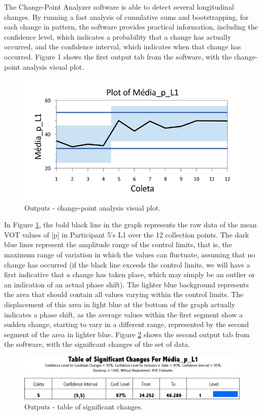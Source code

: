 The Change-Point Analyzer software is able to detect several longitudinal
changes. By running a fast analysis of cumulative sums and bootstrapping, for
each change in pattern, the software provides practical information, including
the confidence level, which indicates a probability that a change has actually
occurred, and the confidence interval, which indicates when that change has
occurred. Figure 1 shows the first output tab from the software, with the
change-point analysis visual plot.

\begin{figure}[h]
\centering
\includegraphics[width=0.7\linewidth]{imgs/lauracastilho22-image1.png}
\caption{Outputs - change-point analysis visual plot.} 
\label{laura-fig01}
\end{figure}

In Figure \ref{laura-fig01}, the bold black line in the graph represents the raw data of the
mean VOT values of [p] in Participant 5’s L1 over the 12 collection points. The
dark blue lines represent the amplitude range of the control limits, that is,
the maximum range of variation in which the values can fluctuate, assuming that
no change has occurred (if the black line exceeds the control limits, we will
have a first indicative that a change has taken place, which may simply be an
outlier or an indication of an actual phase shift). The lighter blue background
represents the area that should contain all values varying within the control
limits. The displacement of this area in light blue at the bottom of the graph
actually indicates a phase shift, as the average values within the first
segment show a sudden change, starting to vary in a different range,
represented by the second segment of the area in lighter blue. Figure \ref{laura-fig02} shows
the second output tab from the software, with the significant changes of the
set of data.

\begin{figure}[h]
\centering
\includegraphics[width=\linewidth]{imgs/lauracastilho22-image2.png}
\caption{Outputs - table of significant changes.} 
\label{laura-fig02}
\end{figure}


